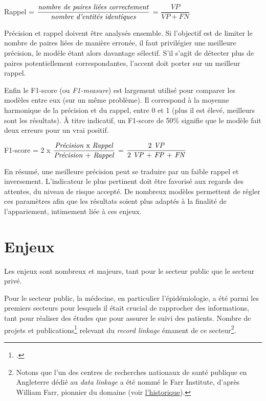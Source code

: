 \documentclass[a4paper,12pt,twoside]{book}
\begin{document}
			    Rappel = $ \dfrac{\mbox{\textit{nombre de paires liées correctement}}}{\mbox{\textit{nombre d'entités identiques}}} $ = $ \dfrac{VP}{VP + FN} $
			    \newline
			    
			    Précision et rappel doivent être analysés ensemble. Si l'objectif est de limiter le nombre de paires liées de manière erronée, il faut privilégier une meilleure précision, le modèle étant alors davantage sélectif. S'il s'agit de détecter plus de paires potentiellement correspondantes, l'accent doit porter sur un meilleur rappel.
			    
			    Enfin le F1-score (ou \textit{F1-measure}) est largement utilisé pour comparer les modèles entre eux (sur un même problème). Il correspond à la moyenne harmonique de la précision et du rappel, entre 0 et 1 (plus il est élevé, meilleurs sont les résultats). À titre indicatif, un F1-score de 50\% signifie que le modèle fait deux erreurs pour un vrai positif.
			    \newline
			    
			    F1-score = 2 x $ \dfrac{\mbox{\textit{Précision} x \textit{Rappel}}}{\mbox{\textit{Précision} + \textit{Rappel}}} $ = $ \dfrac{\mbox{2 \textit{VP}}}{\mbox{2 \textit{VP} + \textit{FP} + \textit{FN}}} $
			    \pagebreak
			    
			    En résumé, une meilleure précision peut se traduire par un faible rappel et inversement. L'indicateur le plus pertinent doit être favorisé aux regards des attentes, du niveau de risque accepté. De nombreux modèles permettent de régler ces paramètres afin que les résultats soient plus adaptés à la finalité de l'appariement, intimement liée à ces enjeux.
			    
		\section{Enjeux}
			 
			 Les enjeux sont nombreux et majeurs, tant pour le secteur public que le secteur privé.

			 Pour le secteur public, la médecine, en particulier l'épidémiologie, a été parmi les premiers secteurs pour lesquels il était crucial de rapprocher des informations, tant pour réaliser des études que pour assurer le suivi des patients. Nombre de projets et publications\footcites[Quelques exemples~:]{smithDataLinkageAustralia2021,sayersProbabilisticRecordLinkage2016,kirielleUnsupervisedGraphbasedEntity} relevant du \textit{record linkage} émanent de ce secteur\footnote{Notons que l'un des centres de recherches nationaux de santé publique en Angleterre dédié au \textit{data linkage} a été nommé le Farr Institute, d'après William Farr, pionnier du domaine (voir \hyperref[historl]{l'historique}).}.
			 
\end{document}

